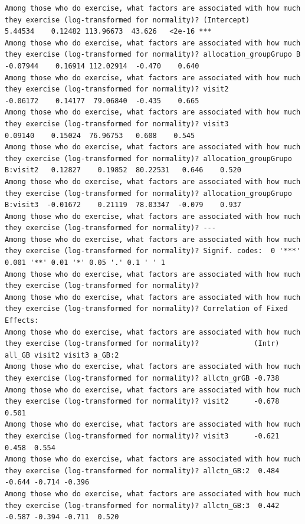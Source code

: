\documentclass[
  12pt,
]{article}
\begin{document}
\begin{verbatim}
Among those who do exercise, what factors are associated with how much they exercise (log-transformed for normality)? (Intercept)                      5.44534    0.12482 113.96673  43.626   <2e-16 ***
Among those who do exercise, what factors are associated with how much they exercise (log-transformed for normality)? allocation_groupGrupo B         -0.07944    0.16914 112.02914  -0.470    0.640    
Among those who do exercise, what factors are associated with how much they exercise (log-transformed for normality)? visit2                          -0.06172    0.14177  79.06840  -0.435    0.665    
Among those who do exercise, what factors are associated with how much they exercise (log-transformed for normality)? visit3                           0.09140    0.15024  76.96753   0.608    0.545    
Among those who do exercise, what factors are associated with how much they exercise (log-transformed for normality)? allocation_groupGrupo B:visit2   0.12827    0.19852  80.22531   0.646    0.520    
Among those who do exercise, what factors are associated with how much they exercise (log-transformed for normality)? allocation_groupGrupo B:visit3  -0.01672    0.21119  78.03347  -0.079    0.937    
Among those who do exercise, what factors are associated with how much they exercise (log-transformed for normality)? ---
Among those who do exercise, what factors are associated with how much they exercise (log-transformed for normality)? Signif. codes:  0 '***' 0.001 '**' 0.01 '*' 0.05 '.' 0.1 ' ' 1
Among those who do exercise, what factors are associated with how much they exercise (log-transformed for normality)? 
Among those who do exercise, what factors are associated with how much they exercise (log-transformed for normality)? Correlation of Fixed Effects:
Among those who do exercise, what factors are associated with how much they exercise (log-transformed for normality)?             (Intr) all_GB visit2 visit3 a_GB:2
Among those who do exercise, what factors are associated with how much they exercise (log-transformed for normality)? allctn_grGB -0.738                            
Among those who do exercise, what factors are associated with how much they exercise (log-transformed for normality)? visit2      -0.678  0.501                     
Among those who do exercise, what factors are associated with how much they exercise (log-transformed for normality)? visit3      -0.621  0.458  0.554              
Among those who do exercise, what factors are associated with how much they exercise (log-transformed for normality)? allctn_GB:2  0.484 -0.644 -0.714 -0.396       
Among those who do exercise, what factors are associated with how much they exercise (log-transformed for normality)? allctn_GB:3  0.442 -0.587 -0.394 -0.711  0.520
\end{verbatim}
\end{document}
